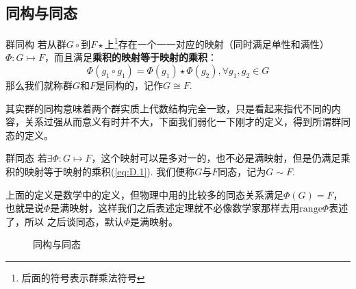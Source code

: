 \subsection{同构与同态}
\begin{define}{群同构}
    若从群$G\circ$到$F\star$上\footnote{后面的符号表示群乘法符号}存在一个一一对应的映射（同时满足单性和满性）$\Phi:G\mapsto F$，而且满足\textbf{乘积的映射等于映射的乘积}：
    \begin{equation}
        \label{eq:D.1}
        \Phi(g_1\circ g_1)=\Phi(g_1)\star\Phi(g_2),\forall g_1,g_2\in G
    \end{equation}
    那么我们就称群$G$和$F$是同构的，记作$G\cong F$.
\end{define}
其实群的同构意味着两个群实质上代数结构完全一致，只是看起来指代不同的内容，关系过强从而意义有时并不大，下面我们弱化一下刚才的定义，得到所谓群同态的定义。
\begin{define}{群同态}
    若$\exists \Phi:G\mapsto F$，这个映射可以是多对一的，也不必是满映射，但是仍满足乘积的映射等于映射的乘积(\ref{eq:D.1}). 我们便称$G$与$F$同态，记为$G\sim F$.
\end{define}
上面的定义是数学中的定义，但物理中用的比较多的同态关系满足$\Phi(G)=F$，也就是说$\Phi$是满映射，这样我们之后表述定理就不必像数学家那样去用$\mathrm{range}\Phi$表述了，所以
之后谈同态，{\color{red}默认$\Phi$是满映射}。
\begin{figure}[h]
    \centering
    \quad
    \caption{同构与同态}
    \label{fig:D.1}
\end{figure}
